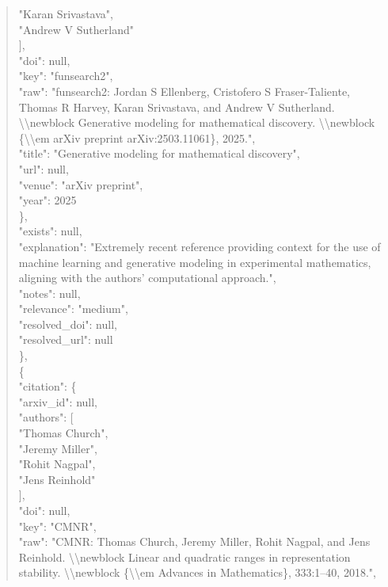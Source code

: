 \documentclass[11pt]{article}
\begin{document}
\begin{quote}
          "Karan Srivastava",\\
          "Andrew V Sutherland"\\
        ],\\
        "doi": null,\\
        "key": "funsearch2",\\
        "raw": "funsearch2: Jordan S Ellenberg, Cristofero S Fraser-Taliente, Thomas R Harvey, Karan Srivastava, and Andrew V Sutherland. \textbackslash{}\textbackslash{}newblock Generative modeling for mathematical discovery. \textbackslash{}\textbackslash{}newblock \{\textbackslash{}\textbackslash{}em arXiv preprint arXiv:2503.11061\}, 2025.",\\
        "title": "Generative modeling for mathematical discovery",\\
        "url": null,\\
        "venue": "arXiv preprint",\\
        "year": 2025\\
      \},\\
      "exists": null,\\
      "explanation": "Extremely recent reference providing context for the use of machine learning and generative modeling in experimental mathematics, aligning with the authors' computational approach.",\\
      "notes": null,\\
      "relevance": "medium",\\
      "resolved\_doi": null,\\
      "resolved\_url": null\\
    \},\\
    \{\\
      "citation": \{\\
        "arxiv\_id": null,\\
        "authors": [\\
          "Thomas Church",\\
          "Jeremy Miller",\\
          "Rohit Nagpal",\\
          "Jens Reinhold"\\
        ],\\
        "doi": null,\\
        "key": "CMNR",\\
        "raw": "CMNR: Thomas Church, Jeremy Miller, Rohit Nagpal, and Jens Reinhold. \textbackslash{}\textbackslash{}newblock Linear and quadratic ranges in representation stability. \textbackslash{}\textbackslash{}newblock \{\textbackslash{}\textbackslash{}em Advances in Mathematics\}, 333:1--40, 2018.",\\

\end{quote}
\end{document}
